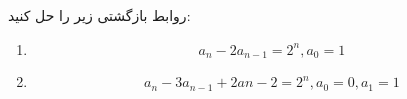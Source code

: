     \p 
روابط بازگشتی زیر را حل کنید:
\begin{enumerate}
\item
$$a_n - 2a_{n-1} = 2^n, a_0 = 1$$
\item
$$a_n - 3a_{n-1} + 2a{n-2} = 2^n, a_0 = 0, a_1 = 1$$
\end{enumerate}